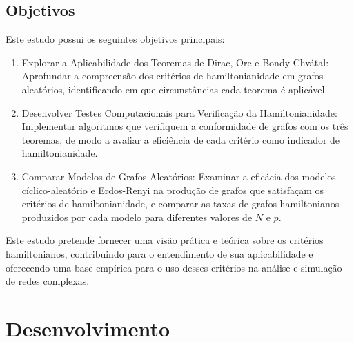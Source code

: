 \documentclass[12pt, openright, oneside, a4paper, chapter=TITLE, section=TITLE, subsection=TITLE, subsubsection=TITLE, brazil]{abntex2}
\begin{document}
\section{Objetivos}
Este estudo possui os seguintes objetivos principais:
\begin{enumerate}
    \item Explorar a Aplicabilidade dos Teoremas de Dirac, Ore e Bondy-Chvátal: Aprofundar a compreensão dos critérios de hamiltonianidade em grafos aleatórios, identificando em que circunstâncias cada teorema é aplicável.
    \item Desenvolver Testes Computacionais para Verificação da Hamiltonianidade: Implementar algoritmos que verifiquem a conformidade de grafos com os três teoremas, de modo a avaliar a eficiência de cada critério como indicador de hamiltonianidade.
    \item Comparar Modelos de Grafos Aleatórios: Examinar a eficácia dos modelos cíclico-aleatório e Erdos-Renyi na produção de grafos que satisfaçam os critérios de hamiltonianidade, e comparar as taxas de grafos hamiltonianos produzidos por cada modelo para diferentes valores de $N$ e $p$.
\end{enumerate}
Este estudo pretende fornecer uma visão prática e teórica sobre os critérios hamiltonianos, contribuindo para o entendimento de sua aplicabilidade e oferecendo uma base empírica para o uso desses critérios na análise e simulação de redes complexas.

\chapter{Desenvolvimento}

\printindex
\end{document}
